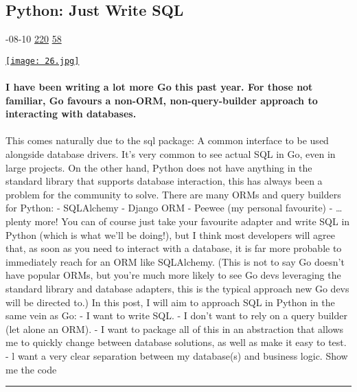 \documentclass[10pt,a4paper]{article}
\begin{document}
\begin{multicols}{2}
\begin{minipage}{\linewidth}
\subsection{Python: Just Write SQL}
\textsc{\footnotesize
{\scriptsize\faCalendar}-08-10 
{\scriptsize\faThumbsOUp}\space 
\href{http://news.ycombinator.com/item?id=37118633\&utm\_term=comment}{220} 
{\scriptsize\faComments}\space 
\href{http://news.ycombinator.com/item?id=37118633\&utm\_term=comment}{58} 
}
\par\medskip\noindent
\href{https://joaodlf.com/python-just-write-sql?utm\_source=hackernewsletter\&utm\_medium=email\&utm\_term=code}{
    \texttt{[image: 26.jpg]}
}
\end{minipage}
\paragraph{}
\textbf{I have been writing a lot more Go this past year. For those not familiar, Go favours a non-ORM, non-query-builder approach to interacting with databases.}
\paragraph{}
 This comes naturally due to the sql package: A common interface to be used alongside database drivers. It’s very common to see actual SQL in Go, even in large projects. On the other hand, Python does not have anything in the standard library that supports database interaction, this has always been a problem for the community to solve. There are many ORMs and query builders for Python:
- SQLAlchemy
- Django ORM
- Peewee (my personal favourite)
- … plenty more!
You can of course just take your favourite adapter and write SQL in Python (which is what we’ll be doing!), but I think most developers will agree that, as soon as you need to interact with a database, it is far more probable to immediately reach for an ORM like SQLAlchemy.
(This is not to say Go doesn’t have popular ORMs, but you’re much more likely to see Go devs leveraging the standard library and database adapters, this is the typical approach new Go devs will be directed to.)
In this post, I will aim to approach SQL in Python in the same vein as Go:
- I want to write SQL.
- I don’t want to rely on a query builder (let alone an ORM).
- I want to package all of this in an abstraction that allows me to quickly change between database solutions, as well as make it easy to test.
- l want a very clear separation between my database(s) and business logic.
Show me the code
\par\noindent\textcolor{red}{\rule{\linewidth}{0.2mm}}
\vfill
\null
\noindent\begin{minipage}{\linewidth}

\end{minipage}
\end{multicols}
\end{document}
